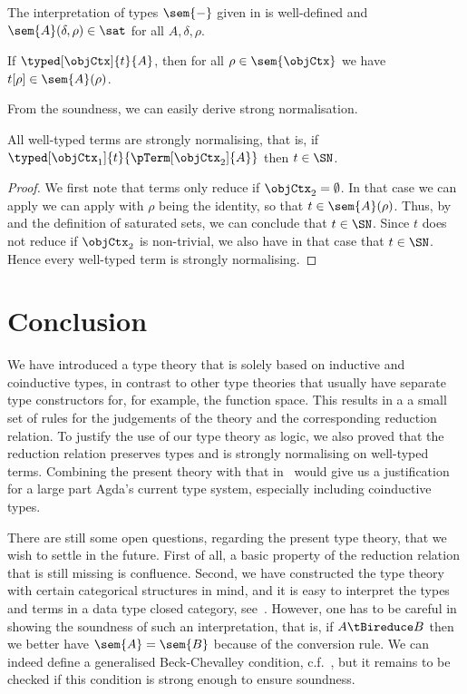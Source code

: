 \documentclass[preprint]{sigplanconf}
\begin{document}
\begin{lemma}
  \label{lem:interpret-sat}
  The interpretation of types $\sem{-}$ given in 
  is well-defined and
  $\sem{A}(\delta, \rho) \in \sat$ for all $A, \delta, \rho$.
\end{lemma}

\begin{lemma}[Soundness]
  \label{lem:sat-sound}
  If $\typed[\objCtx]{t}{A}$, then for all $\rho \in \sem{\objCtx}$ we have
  $t[\rho] \in \sem{A}(\rho)$.
\end{lemma}

From the soundness, we can easily derive strong normalisation.
\begin{theorem}
  All well-typed terms are strongly normalising, that is,
  if $\typed[\objCtx_1]{t}{\pTerm[\objCtx_2]{A}}$ then
  $t \in \SN$.
\end{theorem}
\begin{proof}
  We first note that terms only reduce if $\objCtx_2 = \emptyset$.
  In that case we can apply we can apply  with
  $\rho$ being the identity, so that $t \in \sem{A}(\rho)$.
  Thus, by  and the definition of saturated sets,
  we can conclude that $t \in \SN$.
  Since $t$ does not reduce if $\objCtx_2$ is non-trivial, we also have
  in that case that $t \in \SN$.
  Hence every well-typed term is strongly normalising.
\end{proof}

 \section{Conclusion}
\label{sec:conclusion}

We have introduced a type theory that is solely based on inductive and
coinductive types, in contrast to other type theories that usually have
separate type constructors for, for example, the function space.
This results in a a small set of rules for the judgements of the theory
and the corresponding reduction relation.
To justify the use of our type theory as logic, we also proved that the
reduction relation preserves types and is strongly normalising on well-typed
terms.
Combining the present theory with that in~\cite{norell:thesis}
would give us a justification for a large part Agda's current type system,
especially including coinductive types.

There are still some open questions, regarding the present type theory,
that we wish to settle in the future.
First of all, a basic property of the reduction relation that is still missing
is confluence.
Second, we have constructed the type theory with certain categorical
structures in mind, and it is easy to interpret the types and terms in a data
type closed category, see~\cite{Basold-DepCoindFibDialg}.
However, one has to be careful in showing the soundness of such an
interpretation, that is, if $A \tBireduce B$ then we better have
$\sem{A} = \sem{B}$ because of the conversion rule.
We can indeed define a generalised Beck-Chevalley condition,
c.f.~\cite{Jacobs1999-CLTT}, but it remains to be checked if this condition is
strong enough to ensure soundness.
\end{document}
